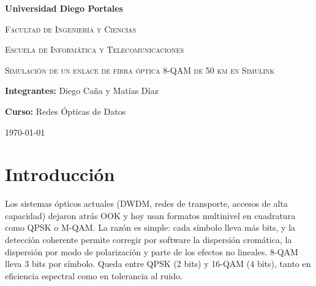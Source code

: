 \documentclass[10pt,a4paper]{article}
\begin{document}
\begin{titlepage}\centering
\vspace*{2cm}
{\LARGE\bfseries Universidad Diego Portales\par}
\vspace{1cm}
{\large\scshape Facultad de Ingeniería y Ciencias\par}
\vspace{0.3cm}
{\scshape Escuela de Informática y Telecomunicaciones\par}
\vspace{3cm}
{\huge\scshape Simulación de un enlace de fibra óptica 8-QAM de 50 km en Simulink\par}
\vfill
\textbf{Integrantes:} Diego Caña y Matías Díaz\par\vspace{0.4cm}
\textbf{Curso:} Redes Ópticas de Datos\par
\vspace{6cm}
\today
\end{titlepage}

\begin{abstract}
Simulamos en Simulink (MATLAB R2026b) un enlace de fibra óptica de \SI{50}{km} que transmite bits con modulación 8-QAM a \SI{15}{Gbaud}, es decir, \SI{45}{Gb/s}. La potencia media es de \SI{1}{W} y los filtros de coseno alzado usan roll-off 0,25 y span de 10 símbolos. El canal incluye la atenuación de la fibra ($\alpha=\SI{0.2}{dB/km}$, \SI{10}{dB} en total), ruido AWGN fijado por $E_b/N_0$ y la dispersión cromática ($D=\SI{17}{ps/(nm.km)}$), implementada con un filtro FIR. En el receptor agregamos un segundo FIR que la compensa. La BER simulada coincide con la teórica de 8-QAM: a \SI{10}{dB} obtuvimos $6{,}9\cdot10^{-4}$ y la teoría da $6{,}5\cdot10^{-4}$. Probamos ocho cambios sobre el enlace. Los filtros mal emparejados, un roll-off muy bajo o un span corto generan interferencia entre símbolos (ISI), con penalidades de 1 a \SI{3}{dB} o pisos de error. Un bit de error en el retardo, o quitar el control de ganancia, deja el enlace inservible. Con dispersión cromática y sin compensarla, la BER no baja de 0,15; con el ecualizador vuelve a la curva teórica.
\end{abstract}

\section{Introducción}
Los sistemas ópticos actuales (DWDM, redes de transporte, accesos de alta capacidad) dejaron atrás OOK y hoy usan formatos multinivel en cuadratura como QPSK o M-QAM. La razón es simple: cada símbolo lleva más bits, y la detección coherente permite corregir por software la dispersión cromática, la dispersión por modo de polarización y parte de los efectos no lineales. 8-QAM lleva 3 bits por símbolo. Queda entre QPSK (2 bits) y 16-QAM (4 bits), tanto en eficiencia espectral como en tolerancia al ruido.
\end{document}

